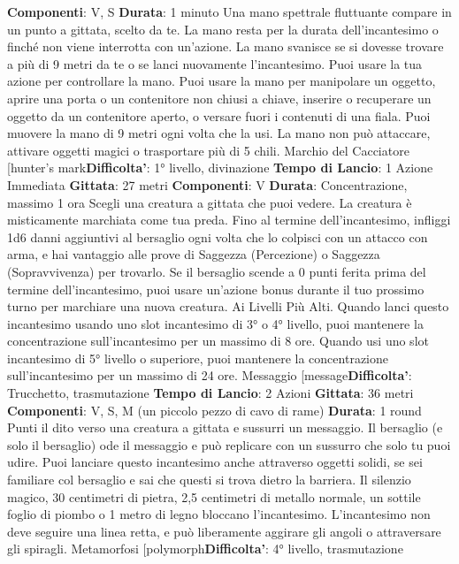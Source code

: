 \begin{multicols}{2}
\textbf{Componenti}: V, S
\textbf{Durata}: 1 minuto
Una mano spettrale fluttuante compare in un punto a
gittata, scelto da te. La mano resta per la durata
dell’incantesimo o finché non viene interrotta con
un’azione. La mano svanisce se si dovesse trovare a
più di 9 metri da te o se lanci nuovamente
l’incantesimo.
Puoi usare la tua azione per controllare la mano. Puoi
usare la mano per manipolare un oggetto, aprire una
porta o un contenitore non chiusi a chiave, inserire o
recuperare un oggetto da un contenitore aperto, o
versare fuori i contenuti di una fiala. Puoi muovere la
mano di 9 metri ogni volta che la usi.
La mano non può attaccare, attivare oggetti magici o
trasportare più di 5 chili.
Marchio del Cacciatore
[hunter’s mark\textbf{Difficolta'}:
1° livello, divinazione
\textbf{Tempo di Lancio}: 1 Azione Immediata
\textbf{Gittata}: 27 metri
\textbf{Componenti}: V
\textbf{Durata}: Concentrazione, massimo 1 ora
Scegli una creatura a gittata che puoi vedere. La
creatura è misticamente marchiata come tua preda.
Fino al termine dell’incantesimo, infliggi 1d6 danni
aggiuntivi al bersaglio ogni volta che lo colpisci con un
attacco con arma, e hai vantaggio alle prove di
Saggezza (Percezione) o Saggezza (Sopravvivenza)
per trovarlo. Se il bersaglio scende a 0 punti ferita prima
del termine dell’incantesimo, puoi usare un’azione
bonus durante il tuo prossimo turno per marchiare una
nuova creatura.
Ai Livelli Più Alti. Quando lanci questo incantesimo
usando uno slot incantesimo di 3° o 4° livello, puoi
mantenere la concentrazione sull’incantesimo per un
massimo di 8 ore. Quando usi uno slot incantesimo di
5° livello o superiore, puoi mantenere la concentrazione
sull’incantesimo per un massimo di 24 ore.
Messaggio
[message\textbf{Difficolta'}:
Trucchetto, trasmutazione
\textbf{Tempo di Lancio}: 2 Azioni
\textbf{Gittata}: 36 metri
\textbf{Componenti}: V, S, M (un piccolo pezzo di cavo di
rame)
\textbf{Durata}: 1 round
Punti il dito verso una creatura a gittata e sussurri un
messaggio. Il bersaglio (e solo il bersaglio) ode il
messaggio e può replicare con un sussurro che solo tu
puoi udire.
Puoi lanciare questo incantesimo anche attraverso
oggetti solidi, se sei familiare col bersaglio e sai che
questi si trova dietro la barriera. Il silenzio magico, 30
centimetri di pietra, 2,5 centimetri di metallo normale,
un sottile foglio di piombo o 1 metro di legno bloccano
l’incantesimo. L’incantesimo non deve seguire una linea
retta, e può liberamente aggirare gli angoli o
attraversare gli spiragli.
Metamorfosi
[polymorph\textbf{Difficolta'}:
4° livello, trasmutazione

\end{multicols}
